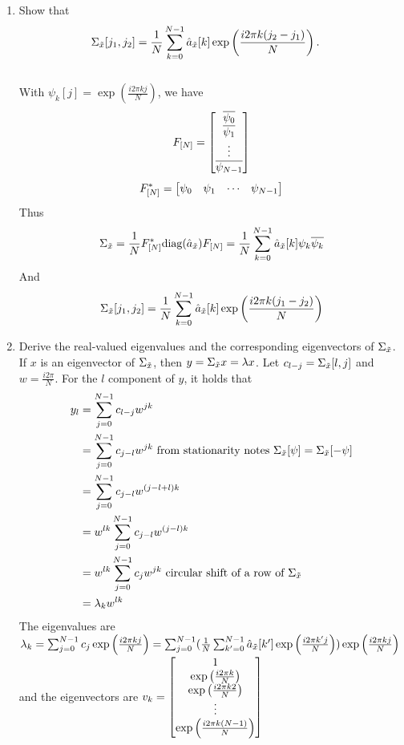 \documentclass[12pt,twoside]{article}
\begin{document}
\begin{enumerate}
\begin{enumerate}
 \item Show that
 \begin{align}
 \Sigma_{\tilde{  x }}[j_1,j_2] & = \frac{1}{N}\sum_{k=0}^{N-1} \hat{a}_{\tilde{  x }}[k] \exp\left( \frac{i2 \pi k (j_2-j_1)}{N} \right).
 \end{align}  \\
 With $\psi_{k}[j] = \exp( \frac{i 2 \pi k j}{N} )$, we have 
 $$F_{[N]} = \begin{bmatrix} \overline{\psi_0} \\ \overline{\psi_1} \\ \vdots \\ \overline{\psi_{N-1}} \end{bmatrix}$$
 $$ F_{[N]}^* = \begin{bmatrix} \psi_0 & \psi_1 & \cdots & \psi_{N-1} \end{bmatrix}$$
 Thus
 $$\Sigma_{\tilde{  x }} =  \frac{1}{N} F_{[N]}^* \text{diag}(\hat{a}_{\tilde{  x }}) F_{[N]} =  \frac{1}{N}  \sum_{k=0}^{N-1} \hat{a}_{\tilde{  x }}[k] \psi_{k}  \overline{\psi_k}$$
 And $$\Sigma_{\tilde{  x }}[j_1,j_2] = \frac{1}{N}\sum_{k=0}^{N-1} \hat{a}_{\tilde{  x }}[k] \exp\left( \frac{i2 \pi k (j_1-j_2)}{N} \right)$$
 
 
  \item Derive the real-valued eigenvalues and the corresponding eigenvectors of $\Sigma_{\tilde{  x }}$.\\
  
  If $x$ is an eigenvector of $\Sigma_{\tilde{  x }} $, then $y = \Sigma_{\tilde{  x }}  x = \lambda x$.
  Let $c_{l-j} = \Sigma_{\tilde{  x }}[l,j]$ and $w=\frac{i 2 \pi}{N}$.
  For the $l$ component of $y$, it holds that
  \begin{align*}
  	y_l	&= \sum_{j=0}^{N-1} c_{l-j} w^{jk} \\
		&= \sum_{j=0}^{N-1} c_{j-l} w^{jk} \text{ from stationarity notes } \Sigma_{\tilde{  x }} [\psi]= \Sigma_{\tilde{  x }}[-\psi]\\
		&= \sum_{j=0}^{N-1} c_{j-l} w^{(j- l + l)k} \\		
		&= w^{lk} \sum_{j=0}^{N-1} c_{j-l} w^{(j- l)k} \\	
		&= w^{lk} \sum_{j=0}^{N-1} c_j w^{jk} \text{ circular shift of a row of } \Sigma_{\tilde{  x }}\\	
		&= \lambda_k  w^{lk}
  \end{align*}
 The eigenvalues are $\lambda_k=  \sum_{j=0}^{N-1} c_j  \exp\left( \frac{i2 \pi k j}{N} \right) =   \sum_{j=0}^{N-1}  (\frac{1}{N} \sum_{k'=0}^{N-1} \hat{a}_{\tilde{  x }}[k'] \exp\left( \frac{i2 \pi k' j}{N} \right))   \exp\left( \frac{i2 \pi k j}{N} \right)$ 
 and the eigenvectors are $v_k= \begin{bmatrix} 1 \\  \exp\left( \frac{i2 \pi k}{N} \right) \\   \exp\left( \frac{i2 \pi k 2}{N} \right) \\ \vdots \\    \exp\left( \frac{i2 \pi k (N-1)}{N} \right)  \end{bmatrix}$


\end{enumerate}
\end{enumerate}
\end{document}
